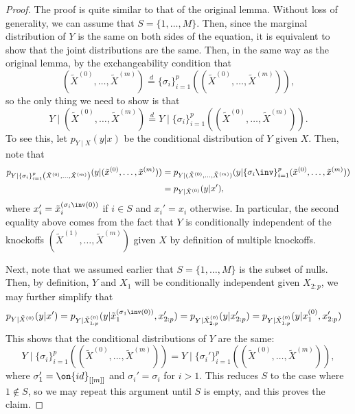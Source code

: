 \begin{proof}
The proof is quite similar to that of the original lemma. Without loss of generality, we can assume that $S = \{ 1, \ldots, M \}$. Then, since the marginal distribution of $Y$ is the same on both sides of the equation, it is equivalent to show that the joint distributions are the same. Then, in the same way as the original lemma, by the exchangeability condition that \[ (\tilde{X}^{(0)}, \ldots, \tilde{X}^{(m)}) \overset{d}= \{ \sigma_i \}_{i=1}^p \left( (\tilde{X}^{(0)}, \ldots, \tilde{X}^{(m)}) \right),\] so the only thing we need to show is that 
\begin{equation}
Y \mid (\tilde{X}^{(0)}, \ldots, \tilde{X}^{(m)}) \overset{d}= Y \mid \{ \sigma_i \}_{i=1}^p \left( (\tilde{X}^{(0)}, \ldots, \tilde{X}^{(m)}) \right).
\end{equation}
To see this, let $p_{Y \mid X}(y|x)$ be the conditional distribution of $Y$ given $X$. Then, note that
\begin{align*}
p_{Y \mid \{ \sigma_i \}_{i=1}^p \left( \tilde{X}^{(0)}, \ldots, \tilde{X}^{(m)} \right)}(y | (\tilde{x}^{(0)}, \ldots , \tilde{x}^{(m)})) &= p_{Y \mid (\tilde{X}^{(0)}, \ldots, \tilde{X}^{(m)})} (y| \{ \sigma_i\inv \}_{i=1}^p (\tilde{x}^{(0)}, \ldots, \tilde{x}^{(m)}) ) \\
&= p_{Y \mid \tilde{X}^{(0)}} (y| x'),
\end{align*}
where $x_i' = \tilde{x}^{(\sigma_i\inv(0))}_i$ if $i \in S$ and $x_i' = x_i$ otherwise. In particular, the second equality above comes from the fact that $Y$ is conditionally independent of the knockoffs $(\tilde{X}^{(1)}, \ldots, \tilde{X}^{(m)})$ given $X$ by definition of multiple knockoffs.

Next, note that we assumed earlier that $S = \{ 1, \ldots, M \}$ is the subset of nulls. Then, by definition, $Y$ and $X_1$ will be conditionally independent given $X_{2 : p}$, we may further simplify that
\begin{align*}
p_{Y \mid \tilde{X}^{(0)}} (y| x') &= p_{Y \mid \tilde{X}^{(0)}_{1 : p}} (y | \tilde{x}^{(\sigma_1\inv(0))}_1, x'_{2 : p}) = p_{Y \mid \tilde{X}^{(0)}_{2 : p}} (y | x'_{2 : p}) = p_{Y \mid \tilde{X}^{(0)}_{1 : p}} (y | x_1^{(0)}, x'_{2 : p})
\end{align*}
This shows that the conditional distributions of $Y$ are the same:
\[ Y \mid \{ \sigma_i \}_{i=1}^p \left( (\tilde{X}^{(0)}, \ldots, \tilde{X}^{(m)}) \right) = Y \mid \{ \sigma_i' \}_{i=1}^p \left( (\tilde{X}^{(0)}, \ldots, \tilde{X}^{(m)}) \right), \] where $\sigma_1' = \on{id}_{[[m]]}$ and $\sigma_i' = \sigma_i$ for $i  > 1$. This reduces $S$ to the case where $1 \not \in S$, so we may repeat this argument until $S$ is empty, and this proves the claim.
\end{proof}

